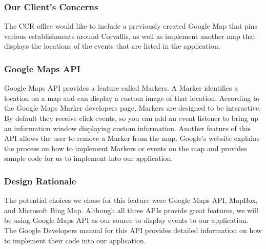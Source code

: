\documentclass[draftclsnofoot, onecolumn, 10pt, compsoc]{IEEEtran}
\begin{document}
			\subsubsection{Our Client's Concerns}
				The CCR office would like to include a previously created Google Map that pins various establishments around Corvallis, as well as implement another map that displays the locations of the events that are listed in the application. 
			\subsubsection{Google Maps API}
				Google Maps API provides a feature called Markers. A Marker identifies a location on a map and can display a custom image of that location. According to the Google Maps Marker developers page, Markers are designed to be interactive. By default they receive click events, so you can add an event listener to bring up an information window displaying custom information. Another feature of this API allows the user to remove a Marker from the map. Google's website explains the process on how to implement Markers or events on the map and provides sample code for us to implement into our application.
				~\cite{GoogleMap}
			\subsubsection{Design Rationale}
				The potential choices we chose for this feature were Google Maps API, MapBox, and Microsoft Bing Map. Although all three APIs provide great features, we will be using Google Maps API as our source to display events to our application. The Google Developers manual for this API provides detailed information on how to implement their code into our application.
				~\cite{GoogleMap}
				
	
	
	
\end{document}
